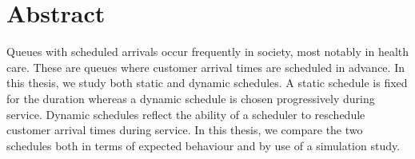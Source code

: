 \chapter*{Abstract}

Queues with scheduled arrivals occur frequently in society, most notably in health care. These are queues where customer arrival times are scheduled in advance. In this thesis, we study both static and dynamic schedules. A static schedule is fixed for the duration whereas a dynamic schedule is chosen progressively during service. Dynamic schedules reflect the ability of a scheduler to reschedule customer arrival times during service. In this thesis, we compare the two schedules both in terms of expected behaviour and by use of a simulation study.